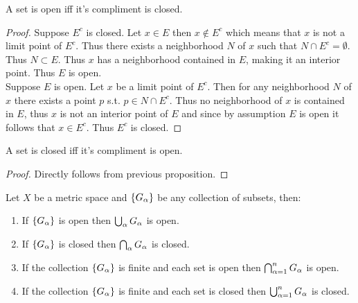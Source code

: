 \begin{proposition}
  A set is open iff it's compliment is closed.
\end{proposition}
\begin{proof}
  Suppose $E^c$ is closed. Let $x\in E$ then $x\notin E^c$ which means that $x$ is not a limit point of $E^c$. Thus there exists a neighborhood $N$ of $x$ such that $N\cap E^c = \emptyset$. Thus $N\subset E$. Thus $x$ has a neighborhood contained in $E$, making it an interior point. Thus $E$ is open.\\

  Suppose $E$ is open. Let $x$ be a limit point of $E^c$. Then for any neighborhood $N$ of $x$ there exists a point $p$ s.t. $p\in N\cap E^c$. Thus no neighborhood of $x$ is contained in $E$, thus $x$ is not an interior point of $E$ and since by assumption $E$ is open it follows that $x\in E^c$. Thus $E^c$ is closed.
\end{proof}
\begin{corollary}
  A set is closed iff it's compliment is open.
\end{corollary}
\begin{proof}
  Directly follows from previous proposition.
\end{proof}
\begin{proposition}
  Let $X$ be a metric space and $\{G_\alpha\}$ be any collection of subsets, then:
  \begin{enumerate}
    \item If $\{G_\alpha\}$ is open then $\bigcup_\alpha G_\alpha$ is open.
    \item If $\{G_\alpha\}$ is closed then $\bigcap_\alpha G_\alpha$ is closed.
    \item If the collection $\{G_\alpha\}$ is finite and each set is open then $\bigcap_{\alpha=1}^n G_\alpha$ is open.
    \item If the collection $\{G_\alpha\}$ is finite and each set is closed then $\bigcup_{\alpha=1}^n G_\alpha$ is closed.
  \end{enumerate}
\end{proposition}
